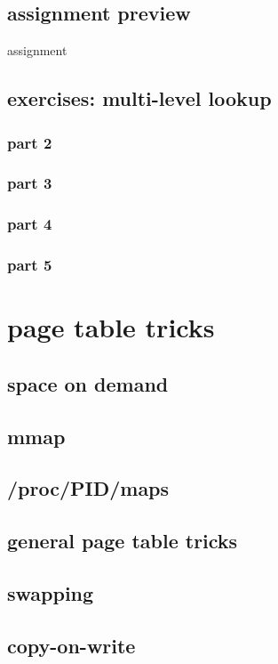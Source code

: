 \subsection{assignment preview}
\begin{frame}{assignment}
\end{frame}

\subsection{exercises: multi-level lookup}
\subsubsection{part 2}

\subsubsection{part 3}


\subsubsection{part 4}

\subsubsection{part 5}



\section{page table tricks}

\subsection{space on demand}


\subsection{mmap}


\subsection{/proc/PID/maps}


\subsection{general page table tricks}


\subsection{swapping}




\subsection{copy-on-write}

